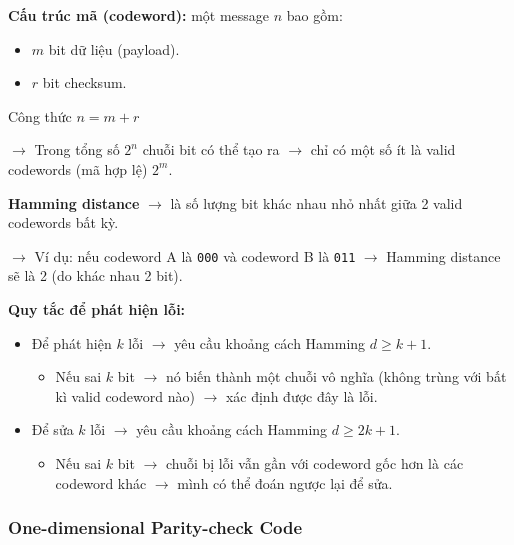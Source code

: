 \noindent
\textbf{Cấu trúc mã (codeword):} một message $n$ bao gồm:

\begin{itemize}
    \item $m$ bit dữ liệu (payload).
    \item $r$ bit checksum.
\end{itemize}
\medskip

\begin{mybox}{Công thức}
$n = m + r$
\end{mybox}

\noindent
$\rightarrow$ Trong tổng số $2^n$ chuỗi bit có thể tạo ra $\rightarrow$ chỉ có một số ít là valid codewords (mã hợp lệ) $2^m$.
\medskip

\noindent
\textbf{Hamming distance} $\rightarrow$ là số lượng bit khác nhau nhỏ nhất giữa 2 valid codewords bất kỳ.

$\rightarrow$ Ví dụ: nếu codeword A là \texttt{000} và codeword B là \texttt{011} $\rightarrow$ Hamming distance sẽ là 2 (do khác nhau 2 bit).
\medskip

\noindent
\textbf{Quy tắc để phát hiện lỗi:}

\begin{itemize}
    \item Để phát hiện $k$ lỗi $\rightarrow$ yêu cầu khoảng cách Hamming $d \geq k + 1$. \begin{itemize}
        \item[$\Rightarrow$] Nếu sai $k$ bit $\rightarrow$ nó biến thành một chuỗi vô nghĩa (không trùng với bất kì valid codeword nào) $\rightarrow$ xác định được đây là lỗi.
    \end{itemize}
    \item Để sửa $k$ lỗi $\rightarrow$ yêu cầu khoảng cách Hamming $d \geq 2k + 1$. \begin{itemize}
        \item[$\Rightarrow$] Nếu sai $k$ bit $\rightarrow$ chuỗi bị lỗi vẫn gần với codeword gốc hơn là các codeword khác $\rightarrow$ mình có thể đoán ngược lại để sửa.
    \end{itemize}
\end{itemize}
\medskip

\subsubsection{One-dimensional Parity-check Code}

